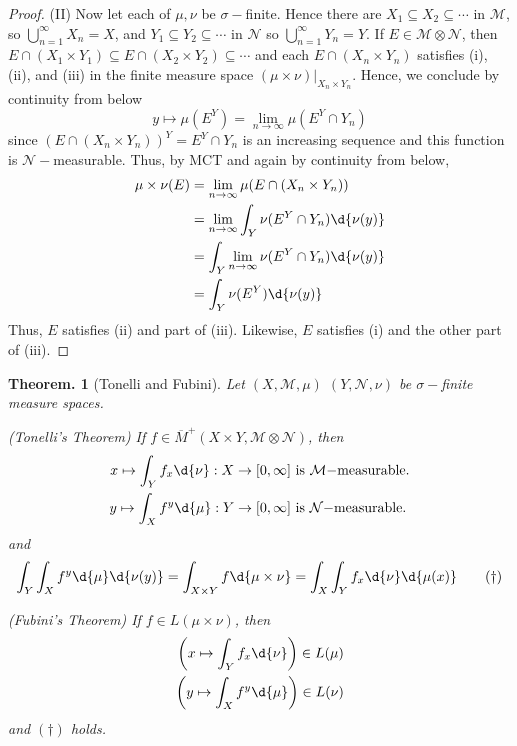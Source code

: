 \documentclass[11pt, a4paper]{memoir}
\theoremstyle{change}
\newtheorem{theorem}{Theorem.}[section]
\theoremstyle{plain}
\theoremstyle{nonumberplain}
\newtheorem{proof}{Proof}
\begin{document}
\begin{proof}
    (II) Now let each of $\mu,\nu$ be $\sigma-$finite.
    Hence there are $X_1\subseteq X_2\subseteq\cdots$ in $\mathcal{M}$, so $\bigcup_{n=1}^\infty X_n=X$, and $Y_1\subseteq Y_2\subseteq\cdots$ in $\mathcal{N}$ so $\bigcup_{n=1}^\infty Y_n=Y$.
    If $E\in\mathcal{M}\otimes\mathcal{N}$, then $E\cap(X_1\times Y_1)\subseteq E\cap(X_2\times Y_2)\subseteq\cdots$ and each $E\cap(X_n\times Y_n)$ satisfies (i), (ii), and (iii) in the finite measure space $(\mu\times\nu)|_{X_n\times Y_n}$.
    Hence, we conclude by continuity from below
    \begin{equation*}
        y\mapsto\mu(E^Y)=\lim_{n\to\infty}\mu(E^Y\cap Y_n)
    \end{equation*}
    since $\left(E\cap(X_n\times Y_n)\right)^Y=E^Y\cap Y_n$ is an increasing sequence and this function is $\mathcal{N}-$measurable.
    Thus, by MCT and again by continuity from below,
    \begin{align*}
        \mu\times\nu(E) &= \lim_{n\to\infty}\mu(E\cap(X_n\times Y_n))\\
                        &= \lim_{n\to\infty}\int_Y\nu(E^Y\cap Y_n)\d{\nu(y)}\\
                        &= \int_Y\lim_{n\to\infty}\nu(E^Y\cap Y_n)\d{\nu(y)}\\
                        &= \int_Y\nu(E^Y)\d{\nu(y)}
    \end{align*}
    Thus, $E$ satisfies (ii) and part of (iii).
    Likewise, $E$ satisfies (i) and the other part of (iii).
\end{proof}
\begin{theorem}[Tonelli and Fubini]
    Let $(X,\mathcal{M},\mu)$ $(Y,\mathcal{N},\nu)$ be $\sigma-$finite measure spaces.

    (\textit{Tonelli's Theorem}) If $f\in\overline{M}^+(X\times Y,\mathcal{M}\otimes\mathcal{N})$, then
    \begin{align*}
        x\mapsto \int_Y f_x\d{\nu}:X\to[0,\infty]&\text{ is $\mathcal{M}-$measurable.}\\
        y\mapsto \int_X f^y\d{\mu}:Y\to[0,\infty]&\text{ is $\mathcal{N}-$measurable.}\\
    \end{align*}
    and
    \begin{equation*}
        \int_Y\int_X f^y\d{\mu}\d{\nu(y)}=\int_{X\times Y}f\d{\mu\times\nu}=\int_X\int_Yf_x\d{\nu}\d{\mu(x)}\tag{$\dagger$}
    \end{equation*}

    (\textit{Fubini's Theorem}) If $f\in L(\mu\times\nu)$, then
    \begin{align*}
        \left(x\mapsto\int_Yf_x\d{\nu}\right)\in L(\mu)\\
        \left(y\mapsto\int_Xf^y\d{\mu}\right)\in L(\nu)
    \end{align*}
    and $(\dagger)$ holds.
\end{theorem}
\end{document}
